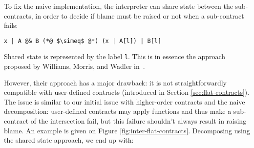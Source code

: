 \documentclass[sigplan,10pt,review,anonymous]{acmart}
\newcommand{\nickel}[1]{\lstinline[language=nickel]{#1}}
\begin{document}
%

To fix the naive implementation, the interpreter can share state between the
sub-contracts, in order to decide if blame must be raised or not when a
sub-contract fails:

\begin{lstlisting}[language=nickel,frame=none,numbers=none]
x | A @& B (*@ $\simeq$ @*) (x | A[l]) | B[l]
\end{lstlisting}

Shared state is represented by the label \nickel{l}. This is in essence the
approach proposed by Williams, Morris, and Wadler in~\cite{RootCauseOfBlame}.




However, their approach has a major drawback: it is not straightforwardly
compatible with user-defined contracts (introduced in Section
\ref{sec:flat-contracts}). The issue is similar to our initial issue with higher-order
contracts and the naive decomposition: user-defined contracts may apply
functions and thus make a sub-contract of the intersection fail, but this
failure shouldn't always result in raising blame. An example is given on Figure
\ref{fig:inter-flat-contracts}. Decomposing using the shared state approach, we
end up with:
\end{document}
